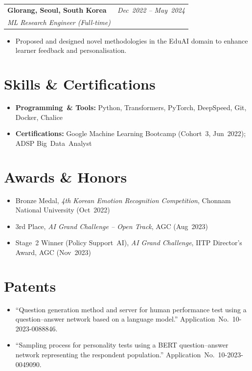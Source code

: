 \documentclass[10pt,a4paper]{article}
\makeatletter
\newcommand{\sectionheading}[1]{\section*{#1}}
\newcommand{\cventry}[4]{%
  \begin{tabularx}{\textwidth}{@{}X r@{}}%
    \textbf{#1} & \textit{#2}\\%
    \textit{#3} & \\
  \end{tabularx}%
  \vspace{2pt}%
  #4%
}
\makeatother
\begin{document}
\cventry{Glorang, Seoul, South Korea}{Dec~2022 -- May~2024}{ML Research Engineer (Full-time)}{%
\begin{itemize}
    \item Proposed and designed novel methodologies in the EduAI domain to enhance learner feedback and personalisation.
\end{itemize}}

\sectionheading{Skills \& Certifications}
\begin{itemize}
    \item \textbf{Programming~\& Tools:} Python, Transformers, PyTorch, DeepSpeed, Git, Docker, Chalice
    \item \textbf{Certifications:} Google Machine Learning Bootcamp (Cohort~3, Jun~2022); ADSP Big~Data~Analyst
\end{itemize}

\sectionheading{Awards \& Honors}
\begin{itemize}
    \item Bronze Medal, \textit{4th Korean Emotion Recognition Competition}, Chonnam National University (Oct~2022)
    \item 3rd Place, \textit{AI Grand Challenge -- Open Track}, AGC (Aug~2023)
    \item Stage~2 Winner (Policy Support~AI), \textit{AI Grand Challenge}, IITP Director's Award, AGC (Nov~2023)
\end{itemize}

\sectionheading{Patents}
\begin{itemize}
    \item ``Question generation method and server for human performance test using a question--answer network based on a language model.'' Application~No.~10-2023-0088846.
    \item ``Sampling process for personality tests using a BERT question--answer network representing the respondent population.'' Application~No.~10-2023-0049090.
\end{itemize}
\end{document}
